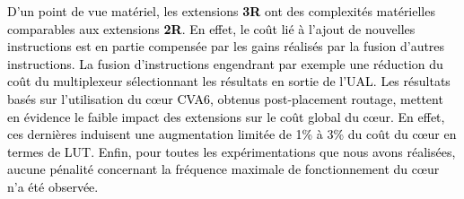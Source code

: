 \documentclass[../main.tex]{subfiles}
\begin{document}
\textcolor{black}{D'un point de vue matériel, les extensions \textbf{3R} ont des complexités matérielles comparables aux extensions \textbf{2R}.
En effet, le coût lié à l'ajout de nouvelles instructions est en partie compensée par les gains réalisés par la fusion d'autres instructions.
La fusion d'instructions engendrant par exemple une réduction du coût du multiplexeur sélectionnant les résultats en sortie de l'UAL.
Les résultats basés sur l'utilisation du cœur CVA6, obtenus post-placement routage, mettent en évidence le faible impact des extensions sur le coût global du cœur.
En effet, ces dernières induisent une augmentation limitée de 1\% à 3\% du coût du cœur en termes de LUT. 
Enfin, pour toutes les expérimentations que nous avons réalisées, aucune pénalité concernant la fréquence maximale de fonctionnement du cœur n'a été observée.}
\end{document}
